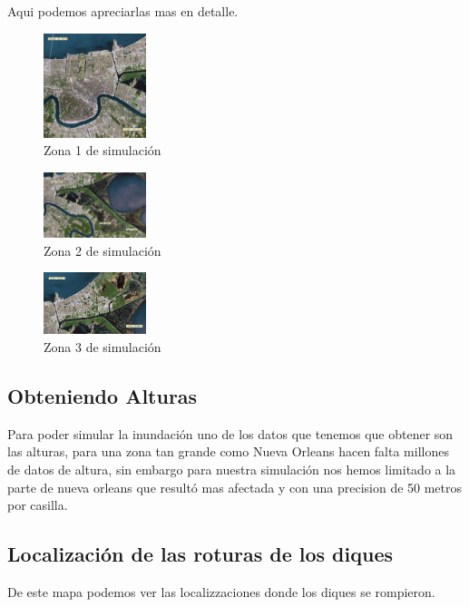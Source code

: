 Aqui podemos apreciarlas mas en detalle.

\begin{figure}[H]
 \centering
 \includegraphics[width=30mm]{figuras/cap6/NOarea2.png}
\caption{Zona 1 de simulación}
\end{figure}

\begin{figure}[H]
 \centering
 \includegraphics[width=30mm]{figuras/cap6/NOarea3.png}
\caption{Zona 2 de simulación}
\end{figure}

\begin{figure}[H]
 \centering
 \includegraphics[width=30mm]{figuras/cap6/NOarea4.png}
\caption{Zona 3 de simulación}
\end{figure}


\subsection*{Obteniendo Alturas}
Para poder simular la inundación uno de los datos que tenemos que obtener son
las alturas, para una zona tan grande como Nueva Orleans hacen falta millones
de datos de altura, sin embargo para nuestra simulación nos hemos limitado a la
parte de nueva orleans que resultó mas afectada y con una precision de 50
metros por casilla.
\subsection*{Localización de las roturas de los diques}
De este mapa podemos ver las localizzaciones donde los diques se rompieron.

